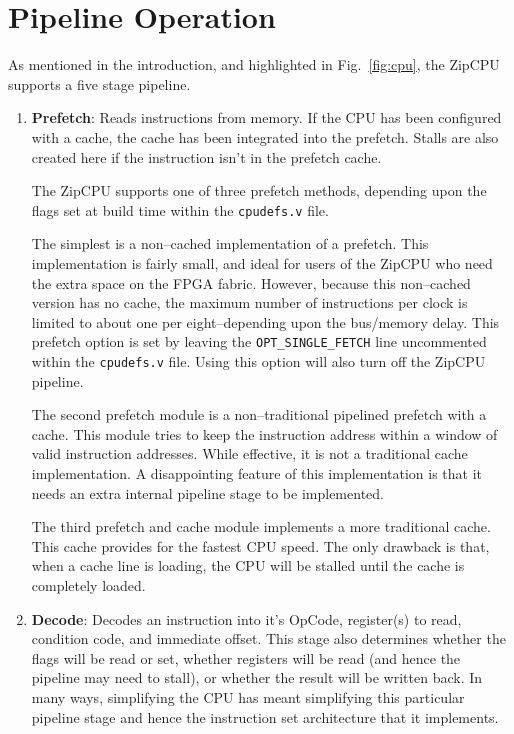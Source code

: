 \documentclass{gqtekspec}
\begin{document}
\section{Pipeline Operation}
As mentioned in the introduction, and highlighted in Fig.~\ref{fig:cpu},
the ZipCPU supports a five stage pipeline.
\begin{enumerate}
\item {\bf Prefetch}: Reads instructions from memory.  If the CPU has been 
	configured with a cache, the cache has been integrated into the
	prefetch.  Stalls are also created here if the instruction isn't
	in the prefetch cache.

	The ZipCPU supports one of three prefetch methods, depending upon the
	flags set at build time within the {\tt cpudefs.v} file. 

	The simplest
	is a non--cached implementation of a prefetch.  This implementation is
	fairly small, and ideal for users of the ZipCPU who need the extra
	space on the FPGA fabric.  However, because this non--cached version
	has no cache, the maximum number of instructions per clock is limited
	to about one per eight--depending upon the bus/memory delay.
	This prefetch option is set by leaving the {\tt OPT\_SINGLE\_FETCH}
	line uncommented within the {\tt cpudefs.v} file.  Using this option
	will also turn off the ZipCPU pipeline.

	The second prefetch module is a non--traditional pipelined prefetch
	with a cache.  This module tries to keep the instruction address
	within a window of valid instruction addresses.  While effective, it
	is not a traditional cache implementation.  A disappointing feature of
	this implementation is that it needs an extra internal pipeline stage
	to be implemented.

	The third prefetch and cache module implements a more traditional
	cache.  This cache provides for the fastest CPU speed.  The only
	drawback is that, when a cache line is loading, the CPU will be stalled
	until the cache is completely loaded.

\item {\bf Decode}: Decodes an instruction into it's OpCode, register(s) to
	read, condition code, and immediate offset.  This stage also
	determines whether the flags will be read or set, whether registers
	will be read (and hence the pipeline may need to stall), or whether the
	result will be written back.  In many ways, simplifying the CPU has
	meant simplifying this particular pipeline stage and hence the
	instruction set architecture that it implements.


\end{enumerate}
\end{document}
